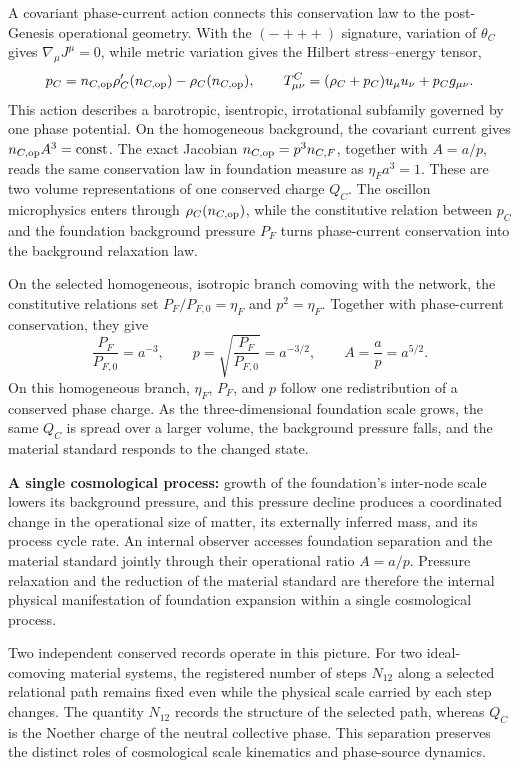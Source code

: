 \documentclass[11pt,a4paper]{article}
\begin{document}
A covariant phase-current action connects this conservation law to the post-Genesis operational geometry. With the $(-+++)$ signature, variation of $\theta_C$ gives $\nabla_\mu J^\mu=0$, while metric variation gives the Hilbert stress--energy tensor,
\begin{equation}
p_C=n_{C,{\rm op}}\rho_C'(n_{C,{\rm op}})-\rho_C(n_{C,{\rm op}}),
\qquad
T^C_{\mu\nu}=(\rho_C+p_C)u_\mu u_\nu+p_Cg_{\mu\nu}.
\end{equation}
This action describes a barotropic, isentropic, irrotational subfamily governed by one phase potential. On the homogeneous background, the covariant current gives $n_{C,{\rm op}}A^3=\mathrm{const}$. The exact Jacobian $n_{C,{\rm op}}=p^3n_{C,F}$, together with $A=a/p$, reads the same conservation law in foundation measure as $\eta_Fa^3=1$. These are two volume representations of one conserved charge $Q_C$. The oscillon microphysics enters through $\rho_C(n_{C,{\rm op}})$, while the constitutive relation between $p_C$ and the foundation background pressure $P_F$ turns phase-current conservation into the background relaxation law.

On the selected homogeneous, isotropic branch comoving with the network, the constitutive relations set $P_F/P_{F,0}=\eta_F$ and $p^2=\eta_F$. Together with phase-current conservation, they give
\begin{equation}
\frac{P_F}{P_{F,0}}=a^{-3},
\qquad
p=\sqrt{\frac{P_F}{P_{F,0}}}=a^{-3/2},
\qquad
A=\frac{a}{p}=a^{5/2}.
\end{equation}
On this homogeneous branch, $\eta_F$, $P_F$, and $p$ follow one redistribution of a conserved phase charge. As the three-dimensional foundation scale grows, the same $Q_C$ is spread over a larger volume, the background pressure falls, and the material standard responds to the changed state.

\textbf{A single cosmological process:} growth of the foundation's inter-node scale lowers its background pressure, and this pressure decline produces a coordinated change in the operational size of matter, its externally inferred mass, and its process cycle rate. An internal observer accesses foundation separation and the material standard jointly through their operational ratio $A=a/p$. Pressure relaxation and the reduction of the material standard are therefore the internal physical manifestation of foundation expansion within a single cosmological process.

Two independent conserved records operate in this picture. For two ideal-comoving material systems, the registered number of steps $N_{12}$ along a selected relational path remains fixed even while the physical scale carried by each step changes. The quantity $N_{12}$ records the structure of the selected path, whereas $Q_C$ is the Noether charge of the neutral collective phase. This separation preserves the distinct roles of cosmological scale kinematics and phase-source dynamics.
\end{document}
